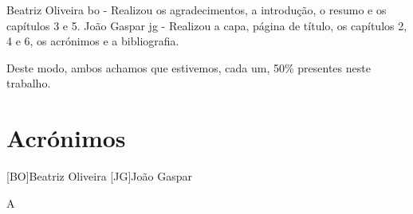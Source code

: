 \documentclass[a4paper,11pt,oneside]{report}
\begin{document}
Beatriz Oliveira \ac{bo} - Realizou os agradecimentos, a introdução, o resumo e os capítulos 3 e 5.
João Gaspar \ac{jg} - Realizou a capa, página de título, os capítulos 2, 4 e 6, os acrónimos e a bibliografia.

Deste modo, ambos achamos que estivemos, cada um, 50\% presentes neste trabalho.


\chapter*{Acrónimos}
\begin{acronym}
[BO]{Beatriz Oliveira}
[JG]{João Gaspar}
\end{acronym}
A

\printbibliography
\end{document}
